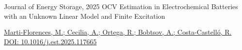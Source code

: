 \cventry
  {Journal of Energy Storage, 2025}
  {OCV Estimation in Electrochemical Batteries with an Unknown Linear Model and Finite Excitation}
  {}
  {}
  {
    \begin{cvitems}
      \item {\href{https://doi.org/10.1016/j.est.2025.117665}{Marti-Florences, M.; Cecilia, A.; Ortega, R.; Bobtsov, A.; Costa-Castell\'o, R. DOI: 10.1016/j.est.2025.117665}}
    \end{cvitems}
  }
